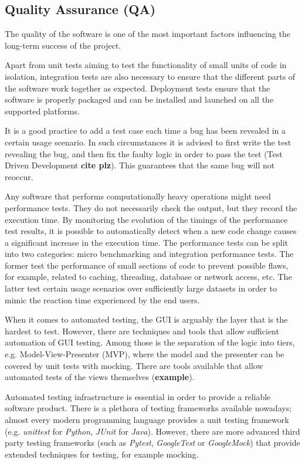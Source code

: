 \documentclass[jnr]{iosart2x}
\newcommand{\todo}[1]{\textbf{#1}}
\begin{document}
\subsection{Quality Assurance (QA)}
\label{Quality assurance}

The quality of the software is one of the most important factors influencing the long-term success of the project.

Apart from unit tests aiming to test the functionality of small units of code in isolation, integration tests are also necessary to ensure that the different parts of the software work together as expected.
Deployment tests ensure that the software is properly packaged and can be installed and launched on all the supported platforms.

It is a good practice to add a test case each time a bug has been revealed in a certain usage scenario.
In such circumstances it is advised to first write the test revealing the bug, and then fix the faulty logic in order to pass the test (Test Driven Development \todo{cite plz}).
This guarantees that the same bug will not reoccur.

Any software that performs computationally heavy operations might need performance tests.
They do not necessarily check the output, but they record the execution time.
By monitoring the evolution of the timings of the performance test results, it is possible to automatically detect when a new code change causes a significant increase in the execution time.
The performance tests can be split into two categories: micro benchmarking and integration performance tests.
The former test the performance of small sections of code to prevent possible flaws, for example, related to caching, threading, database or network access, etc.
The latter test certain usage scenarios over sufficiently large datasets in order to mimic the reaction time  experienced by the end users.

When it comes to automated testing, the GUI is arguably the layer that is the hardest to test.
However, there are techniques and tools that allow sufficient automation of GUI testing.
Among those is the separation of the logic into tiers, e.g. Model-View-Presenter (MVP), where the model and the presenter can be covered by unit tests with mocking.
There are tools available that allow automated tests of the views themselves (\todo{example}).

Automated testing infrastructure is essential in order to provide a reliable software product.
There is a plethora of testing frameworks available nowadays; almost every modern programming language provides a unit testing framework (e.g. {\it unittest} for {\it Python}, {\it JUnit} for {\it Java}).
However, there are more advanced third party testing frameworks (such as {\it Pytest}, {\it GoogleTest} or {\it GoogleMock}) that provide extended techniques for testing, for example mocking.
\end{document}
